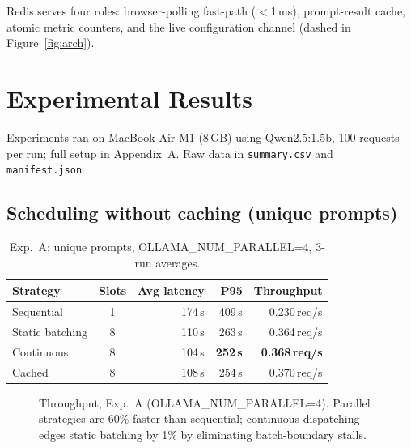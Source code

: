 \documentclass[10pt,a4paper]{article}
\begin{document}
Redis serves four roles: browser-polling fast-path ($<$1\,ms), prompt-result cache,
atomic metric counters, and the live configuration channel (dashed in Figure~\ref{fig:arch}).

\section{Experimental Results}

Experiments ran on MacBook Air M1 (8\,GB) using Qwen2.5:1.5b, 100 requests per run;
full setup in Appendix~A. Raw data in \texttt{summary.csv} and \texttt{manifest.json}.

\subsection*{Scheduling without caching (unique prompts)}

\begin{table}[H]
\centering
\caption{Exp.~A: unique prompts, OLLAMA\_NUM\_PARALLEL=4, 3-run averages.}
\label{tab:expa}
\small\setlength{\tabcolsep}{7pt}
\begin{tabular}{lcrrr}
\toprule
Strategy        & Slots & Avg latency & P95     & Throughput   \\
\midrule
Sequential      & 1     & 174\,s      & 409\,s  & 0.230\,req/s \\
Static batching & 8     & 110\,s      & 263\,s  & 0.364\,req/s \\
Continuous      & 8     & 104\,s      & \textbf{252\,s} & \textbf{0.368\,req/s} \\
Cached          & 8     & 108\,s      & 254\,s  & 0.370\,req/s \\
\bottomrule
\end{tabular}
\end{table}

\begin{figure}[H]
\centering
{}
\caption{Throughput, Exp.~A (OLLAMA\_NUM\_PARALLEL=4). Parallel strategies are 60\% faster
than sequential; continuous dispatching edges static batching by 1\% by eliminating
batch-boundary stalls.}
\label{fig:expa}
\end{figure}
\end{document}
